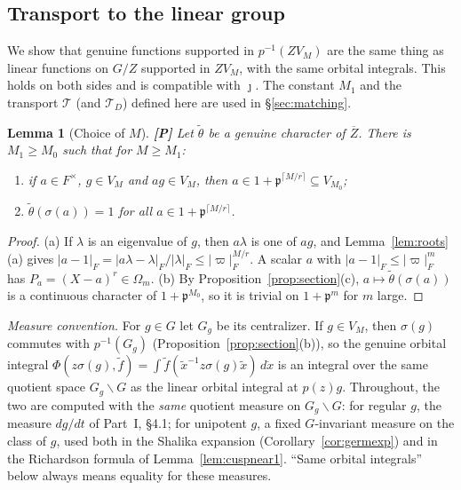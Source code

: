 \documentclass[12pt]{article}
\newcommand{\ov}[1]{\overline{#1}}
\newcommand{\fp}{\mathfrak{p}}
\newcommand{\Zb}{\ov{Z}}
\newcommand{\jj}{\jmath}
\newcommand{\sg}{\sigma}
\newcommand{\Pv}{\textbf{[P]}}
\theoremstyle{plain}
\newtheorem{lemma}[theorem]{Lemma}
\theoremstyle{definition}
\begin{document}
\subsection{Transport to the linear group}\label{subsec:transport}
We show that genuine functions supported in $p^{-1}(ZV_M)$ are the same thing as linear functions on $G/Z$ supported in $ZV_M$, with the same orbital integrals. This holds on both sides and is compatible with $\jj$. The constant $M_1$ and the transport $\mathcal T$ (and $\mathcal T_D$) defined here are used in \S\ref{sec:matching}.

\begin{lemma}[Choice of $M$]\label{lem:chooseM}\Pv
Let $\tilde\theta$ be a genuine character of $\Zb$. There is $M_1\ge M_0$ such that for $M\ge M_1$:
\begin{enumerate}[label=(\alph*)]
\item if $a\in F^\times$, $g\in V_M$ and $ag\in V_M$, then $a\in1+\fp^{\lceil M/r\rceil}\subseteq V_{M_0}$;
\item $\tilde\theta(\sg(a))=1$ for all $a\in1+\fp^{\lceil M/r\rceil}$.
\end{enumerate}
\end{lemma}
\begin{proof}
(a) If $\lambda$ is an eigenvalue of $g$, then $a\lambda$ is one of $ag$, and Lemma~\ref{lem:roots}(a) gives $|a-1|_F=|a\lambda-\lambda|_F/|\lambda|_F\le|\varpi|_F^{M/r}$. A scalar $a$ with $|a-1|_F\le|\varpi|_F^m$ has $P_a=(X-a)^r\in\Omega_m$. (b) By Proposition~\ref{prop:section}(c), $a\mapsto\tilde\theta(\sg(a))$ is a continuous character of $1+\fp^{M_0}$, so it is trivial on $1+\fp^m$ for $m$ large.
\end{proof}

\emph{Measure convention.} For $g\in G$ let $G_g$ be its centralizer. If $g\in V_M$, then $\sg(g)$ commutes with $p^{-1}(G_g)$ (Proposition~\ref{prop:section}(b)), so the genuine orbital integral $\Phi(z\sg(g),\tilde f)=\int\tilde f(\tilde x^{-1}z\sg(g)\tilde x)\,d\dot x$ is an integral over the same quotient space $G_g\backslash G$ as the linear orbital integral at $p(z)g$. Throughout, the two are computed with the \emph{same} quotient measure on $G_g\backslash G$: for regular $g$, the measure $dg/dt$ of Part~I, \S4.1; for unipotent $g$, a fixed $G$-invariant measure on the class of $g$, used both in the Shalika expansion (Corollary~\ref{cor:germexp}) and in the Richardson formula of Lemma~\ref{lem:cuspnear1}. ``Same orbital integrals'' below always means equality for these measures.
\end{document}
